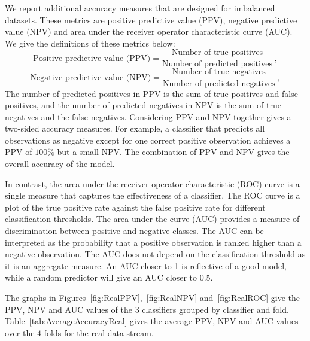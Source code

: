 \documentclass[a4paper,11pt]{article}
\begin{document}
We report additional accuracy measures that are designed for imbalanced datasets. These metrics are positive predictive value (PPV), negative predictive value (NPV) and area under the receiver operator characteristic curve (AUC). We give the definitions of these metrics below:
$$
  \text{Positive predictive value (PPV)} = \frac{ \text{Number of true positives} }{ \text{Number of predicted positives} } \, ,
$$
$$
  \text{Negative predictive value (NPV)} = \frac{ \text{Number of true negatives} }{ \text{Number of predicted negatives} } \, ,
$$
The number of predicted positives in PPV is the sum of true positives and false positives, and the number of predicted negatives in NPV is the sum of true negatives and the false negatives. Considering PPV and NPV together gives a two-sided accuracy measures. For example, a classifier that predicts all observations as negative except for one correct positive observation achieves a PPV of $100\%$ but a small NPV\@. The combination of PPV and NPV gives the overall accuracy of the model.

In contrast, the area under the receiver operator characteristic (ROC) curve is a single measure that captures the effectiveness of a classifier. The ROC curve is a plot of the true positive rate against the false positive rate for different classification thresholds. The area under the curve (AUC) provides a measure of discrimination between positive and negative classes. The AUC can be interpreted as the probability that a positive observation is ranked higher than a negative observation. The AUC does not depend on the classification threshold as it is an aggregate measure. An AUC closer to 1 is reflective of a good model, while a random predictor will give an AUC closer to 0.5.

The graphs in Figures~\ref{fig:RealPPV},~\ref{fig:RealNPV} and~\ref{fig:RealROC} give the PPV, NPV and AUC values of the 3 classifiers grouped by classifier and fold. Table~\ref{tab:AverageAccuracyReal} gives the average PPV, NPV and AUC values over the $4$-folds for the real data stream.



\end{document}
